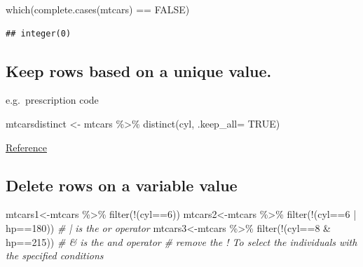 \documentclass[
]{article}
\newenvironment{Shaded}{\begin{snugshade}}{\end{snugshade}}
\newcommand{\AttributeTok}[1]{\textcolor[rgb]{0.77,0.63,0.00}{#1}}
\newcommand{\CommentTok}[1]{\textcolor[rgb]{0.56,0.35,0.01}{\textit{#1}}}
\newcommand{\ConstantTok}[1]{\textcolor[rgb]{0.00,0.00,0.00}{#1}}
\newcommand{\DecValTok}[1]{\textcolor[rgb]{0.00,0.00,0.81}{#1}}
\newcommand{\FunctionTok}[1]{\textcolor[rgb]{0.00,0.00,0.00}{#1}}
\newcommand{\NormalTok}[1]{#1}
\newcommand{\OtherTok}[1]{\textcolor[rgb]{0.56,0.35,0.01}{#1}}
\newcommand{\SpecialCharTok}[1]{\textcolor[rgb]{0.00,0.00,0.00}{#1}}
\begin{document}
\begin{Shaded}
\begin{Highlighting}[]
\FunctionTok{which}\NormalTok{(}\FunctionTok{complete.cases}\NormalTok{(mtcars) }\SpecialCharTok{==} \ConstantTok{FALSE}\NormalTok{)}
\end{Highlighting}
\end{Shaded}

\begin{verbatim}
## integer(0)
\end{verbatim}

\hypertarget{keep-rows-based-on-a-unique-value.}{%
\subsection{Keep rows based on a unique value.}\label{keep-rows-based-on-a-unique-value.}}

e.g.~prescription code

\begin{Shaded}
\begin{Highlighting}[]
\NormalTok{mtcarsdistinct }\OtherTok{\textless{}{-}}\NormalTok{ mtcars }\SpecialCharTok{\%\textgreater{}\%}    \FunctionTok{distinct}\NormalTok{(cyl, }\AttributeTok{.keep\_all=} \ConstantTok{TRUE}\NormalTok{)}
\end{Highlighting}
\end{Shaded}

\href{http://www.datasciencemadesimple.com/remove-duplicate-rows-r-using-dplyr-distinct-function}{Reference}

\hypertarget{delete-rows-on-a-variable-value}{%
\subsection{Delete rows on a variable value}\label{delete-rows-on-a-variable-value}}

\begin{Shaded}
\begin{Highlighting}[]
\NormalTok{mtcars1}\OtherTok{\textless{}{-}}\NormalTok{mtcars }\SpecialCharTok{\%\textgreater{}\%} \FunctionTok{filter}\NormalTok{(}\SpecialCharTok{!}\NormalTok{(cyl}\SpecialCharTok{==}\DecValTok{6}\NormalTok{))}
\NormalTok{mtcars2}\OtherTok{\textless{}{-}}\NormalTok{mtcars }\SpecialCharTok{\%\textgreater{}\%} \FunctionTok{filter}\NormalTok{(}\SpecialCharTok{!}\NormalTok{(cyl}\SpecialCharTok{==}\DecValTok{6} \SpecialCharTok{|}\NormalTok{ hp}\SpecialCharTok{==}\DecValTok{180}\NormalTok{)) }\CommentTok{\# | is the \textquotesingle{}or\textquotesingle{} operator}
\NormalTok{mtcars3}\OtherTok{\textless{}{-}}\NormalTok{mtcars }\SpecialCharTok{\%\textgreater{}\%} \FunctionTok{filter}\NormalTok{(}\SpecialCharTok{!}\NormalTok{(cyl}\SpecialCharTok{==}\DecValTok{8} \SpecialCharTok{\&}\NormalTok{ hp}\SpecialCharTok{==}\DecValTok{215}\NormalTok{)) }\CommentTok{\# \& is the \textquotesingle{}and\textquotesingle{} operator}
\CommentTok{\# remove the ! To select the individuals with the specified conditions}
\end{Highlighting}
\end{Shaded}
\end{document}
